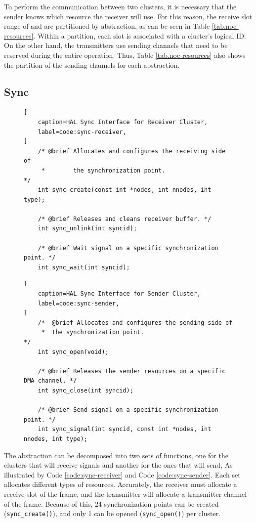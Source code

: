 	To perform the communication between two clusters, it is necessary that the
	sender knows which resource the receiver will use.
	For this reason, the receive slot range of \cnoc and \dnoc are partitioned
	by abstraction, as can be seen in Table \ref{tab.noc-resources}.
	Within a partition, each slot is associated with a cluster's logical ID.
	On the other hand, the transmitters use sending channels that need to
	be reserved during the entire operation.
	Thus, Table \ref{tab.noc-resources} also shows the partition of the
	sending channels for each abstraction.

	\subsection{Sync}

\begin{figure}[t]
\begin{lstlisting}[
	caption=HAL Sync Interface for Receiver Cluster,
	label=code:sync-receiver,
]
	/* @brief Allocates and configures the receiving side of
	 *        the synchronization point.                     */
	int sync_create(const int *nodes, int nnodes, int type);

	/* @brief Releases and cleans receiver buffer. */
	int sync_unlink(int syncid);

	/* @brief Wait signal on a specific synchronization point. */
	int sync_wait(int syncid);
\end{lstlisting}
\end{figure}

\begin{figure}[t]
\begin{lstlisting}[
	caption=HAL Sync Interface for Sender Cluster,
	label=code:sync-sender,
]
	/*  @brief Allocates and configures the sending side of
	 *  the synchronization point.                          */
	int sync_open(void);

	/* @brief Releases the sender resources on a specific DMA channel. */
	int sync_close(int syncid);

	/* @brief Send signal on a specific synchronization point. */
	int sync_signal(int syncid, const int *nodes, int nnodes, int type);
\end{lstlisting}
\end{figure}

		The \sync abstraction can be decomposed into two sets of functions,
		one for the clusters that will receive signals and another for the
		ones that will send, As illustrated by Code \ref{code:sync-receiver}
		and Code \ref{code:sync-sender}.
		Each set allocates different types of resources.
		Accurately, the receiver must allocate a receive slot of the frame,
		and the transmitter will allocate a transmitter channel of the frame.
		Because of this, 24 synchronization points can be created (\texttt{sync\_create()}),
		and only 1 can be opened (\texttt{sync\_open()}) per cluster.

